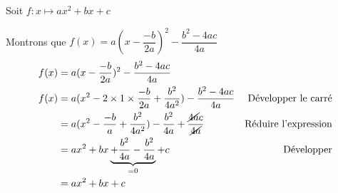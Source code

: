\begin{Demonstration}
    Soit $f: x \mapsto ax^2 +bx + c$

    Montrons que $f(x) = a ( x - \dfrac{-b}{2a} )^2 - \dfrac{b^2-4ac}{4a}$
    \begin{align*}
    f(x)&= a ( x - \dfrac{-b}{2a} )^2 - \dfrac{b^2-4ac}{4a} \\
    f(x)&= a ( x^2 - 2\times 1 \times \dfrac{-b}{2a} + \dfrac{b^2}{4a^2} )  - \dfrac{b^2-4ac}{4a} & \text{Développer le carré}\\
    &= a ( x^2 - \dfrac{-b}{a} + \dfrac{b^2}{4a^2} ) - \dfrac{b^2}{4a} + \dfrac{\cancel{4a}c}{\cancel{4a}} & \text{Réduire l'expression}\\
    &= ax^2 +bx \underbrace{+ \dfrac{b^2}{4a} - \dfrac{b^2}{4a}}_{=0} + c & \text{Développer}\\
    &= ax^2 + bx + c
    \end{align*}
\end{Demonstration}